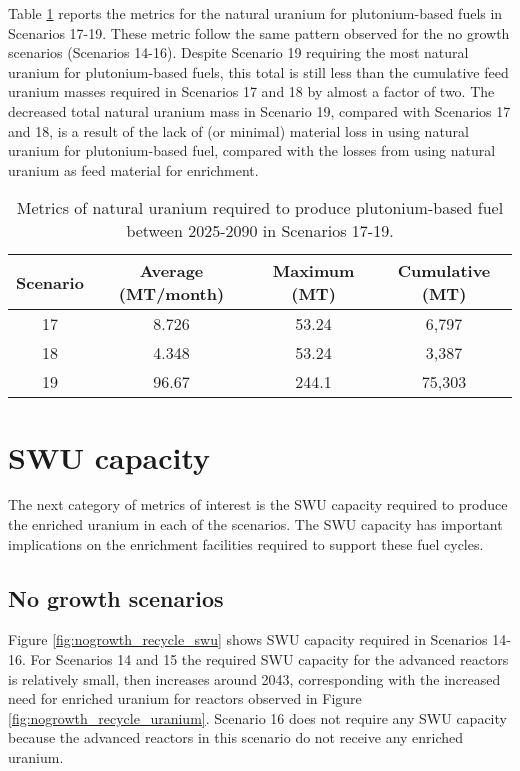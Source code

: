 Table \ref{tab:s17-19_natU} reports the metrics for the 
natural uranium for plutonium-based fuels in Scenarios 17-19. 
These metric follow the same pattern observed for the 
no growth scenarios (Scenarios 14-16). Despite Scenario 19 
requiring the most natural uranium for plutonium-based 
fuels, this total is still less than the cumulative feed uranium 
masses required in Scenarios 17 and 18 by almost a factor 
of two. The decreased total 
natural uranium mass in Scenario 19, compared with Scenarios 
17 and 18, is a result of the lack of (or minimal) material loss in 
using natural uranium for plutonium-based fuel, compared with 
the losses from using natural uranium as feed material for 
enrichment. 

\begin{table}[h!]
    \centering 
    \caption{Metrics of natural uranium required to produce 
    plutonium-based fuel between 2025-2090 in Scenarios 
    17-19.}
    \label{tab:s17-19_natU}
    \begin{tabular}{c c c c}
        \hline 
        Scenario & Average (MT/month) & Maximum (MT) & Cumulative (MT) \\
        \hline
        17 & 8.726 & 53.24 & 6,797\\
        18 & 4.348 & 53.24 & 3,387\\
        19 & 96.67 & 244.1 & 75,303\\
        \hline
    \end{tabular}
\end{table}


\section{SWU capacity}
The next category of metrics of interest is the \gls{SWU} capacity required 
to produce the enriched uranium in each of the scenarios. The \gls{SWU} 
capacity has important implications on the enrichment facilities required 
to support these fuel cycles. 

\subsection{No growth scenarios}
Figure \ref{fig:nogrowth_recycle_swu} shows \gls{SWU} capacity required 
in Scenarios 14-16. For Scenarios 14 and 15 the required \gls{SWU} 
capacity for the advanced reactors is relatively small, then increases 
around 2043, corresponding with the increased need for enriched uranium 
for reactors observed in Figure \ref{fig:nogrowth_recycle_uranium}. Scenario 
16 does not require any \gls{SWU} capacity because the advanced reactors 
in this scenario do not receive any enriched uranium. 

